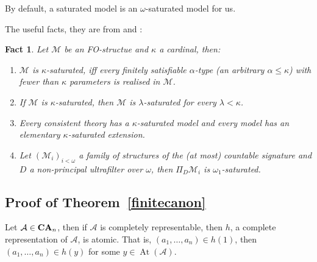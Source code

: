 \documentclass[a4paper]{article}
\theoremstyle{defin}
\theoremstyle{theorem}
\theoremstyle{claim}
\theoremstyle{prop}
\theoremstyle{lemma}
\theoremstyle{fact}
\newtheorem{fact}{Fact}
\theoremstyle{ex}
\theoremstyle{col}
\begin{document}
By default, a saturated model is an $\omega$-saturated model for us.

The useful facts, they are from \cite{chang1990model} and \cite{hodges1993model}:

\begin{fact} Let $\mathcal{M}$ be an FO-structue and $\kappa$ a cardinal, then:
\begin{enumerate}
\item $\mathcal{M}$ is $\kappa$-saturated, iff every finitely satisfiable $\alpha$-type (an arbitrary $\alpha \leq \kappa$) with fewer than $\kappa$ parameters is realised in  $\mathcal{M}$.
\item If $\mathcal{M}$ is $\kappa$-saturated, then $\mathcal{M}$ is $\lambda$-saturated for every $\lambda < \kappa$.
\item \label{saturation} Every consistent theory has a $\kappa$-saturated model and every model has an elementary $\kappa$-saturated extension.
\item Let $(\mathcal{M}_i)_{i < \omega}$ a family of structures of the (at most) countable signature and $D$ a non-principal ultrafilter over $\omega$, then $\Pi_D \mathcal{M}_i$ is $\omega_1$-saturated.
\end{enumerate}
\end{fact}

\subsection{Proof of Theorem~\ref{finitecanon}}

Let $\mathcal{A} \in {\bf CA}_n$, then if $\mathcal{A}$ is completely representable, then $h$, a complete representation of $\mathcal{A}$, is atomic. That is, $(a_1, \dots, a_n) \in h(1)$, then $(a_1, \dots, a_n) \in h(y)$ for some $y \in \operatorname{At}(\mathcal{A})$.
\end{document}
